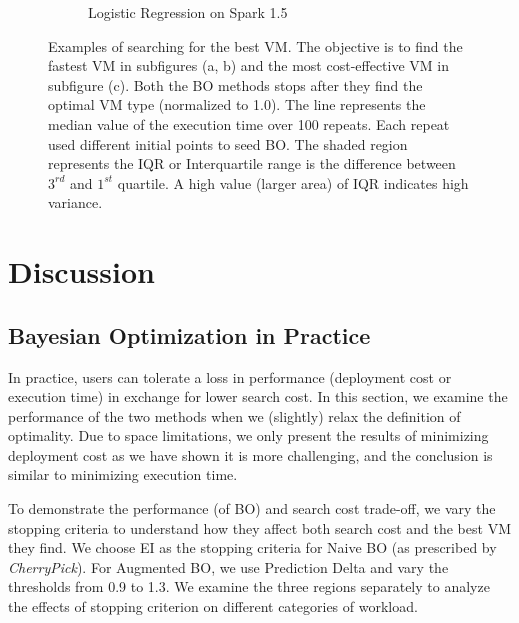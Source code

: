 \begin{figure}[!htbp]
\begin{subfigure}[t]{0.6\textwidth}
    \caption{Logistic Regression on Spark 1.5}
    \label{fig:convergence_cost_2}
\end{subfigure}
\caption{
Examples of searching for the best VM. The objective is to find the fastest VM in subfigures (a, b) and the most cost-effective VM in subfigure (c).  Both the BO methods stops after they find the optimal VM type (normalized to 1.0).  The line represents the median value of the execution time over 100 repeats. Each repeat used different initial points to seed BO. The shaded region represents the IQR or Interquartile range is the difference between $3^{rd}$ and $1^{st}$ quartile. A high value (larger area) of IQR indicates high variance.}
\label{fig:convergence_time}
\end{figure}



\section{Discussion}
\label{sec:practice}

\subsection{Bayesian Optimization in Practice}
\label{sec:bo_practise}
In practice, users can tolerate a loss in performance (deployment cost or execution time) in exchange for lower search cost. In this section, we examine the performance of the two methods
when we (slightly) relax the definition of optimality.
Due to space limitations, we only present the results of minimizing deployment cost as we have shown it is more challenging, and the conclusion is similar to minimizing execution time.

To demonstrate the performance (of BO) and search cost trade-off, we vary the stopping criteria to understand how they affect both search cost and the best VM they find. 
We choose EI as the stopping criteria for Naive BO (as prescribed by \emph{CherryPick}). For Augmented BO, we use Prediction Delta and vary the thresholds from 0.9 to 1.3. We examine the three regions separately to analyze the effects of stopping criterion on different categories of workload.

